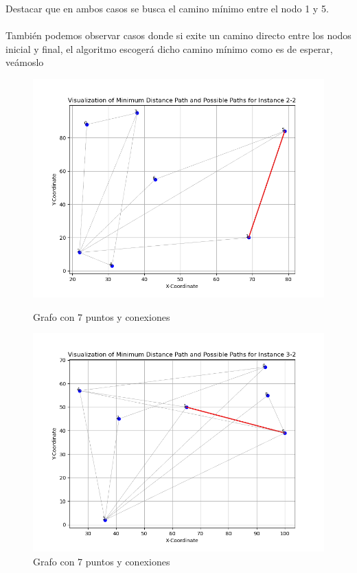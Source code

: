 \documentclass[11pt,openany]{book}
\begin{document}
Destacar que en ambos casos se busca el camino mínimo entre el nodo 1 y 5.\\ \\
También podemos observar casos donde si exite un camino directo entre los nodos inicial y final, el algoritmo escogerá dicho
camino mínimo como es de esperar, veámoslo
\begin{figure}[H]
      \centering
      \begin{minipage}{0.49\textwidth}
            \centering
            \includegraphics[width=1.1\textwidth]{assets/Img/GraficaCaminoMinimo-2-2.png}
            \caption{Grafo con 7 puntos y conexiones}
      \end{minipage}
      \hfill
      \begin{minipage}{0.49\textwidth}
            \centering
            \includegraphics[width=1.1\textwidth]{assets/Img/GraficaCaminoMinimo-3-2.png}
            \caption{Grafo con 7 puntos y conexiones}
      \end{minipage}
\end{figure}
\end{document}
